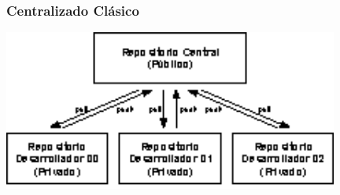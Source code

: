 \documentclass[hanbdout,a4paper,slidestop,dvips,xcolor=pst,blue]{beamer}
\begin{document}
\begin{frame}[c]
	\frametitle{Centralizado Clásico}
    \begin{center}
        \includegraphics[width=11cm,keepaspectratio=true]{images/git/esquemaCentralizado.eps}
    \end{center}
\end{frame}
\end{document}
